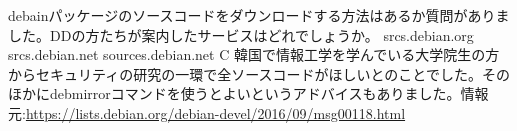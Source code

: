 %

\santaku
{debainパッケージのソースコードをダウンロードする方法はあるか質問がありました。DDの方たちが案内したサービスはどれでしょうか。}
{srcs.debian.org}
{srcs.debian.net}
{sources.debian.net}
{C}
{韓国で情報工学を学んでいる大学院生の方からセキュリティの研究の一環で全ソースコードがほしいとのことでした。そのほかにdebmirrorコマンドを使うとよいというアドバイスもありました。情報元:\url{https://lists.debian.org/debian-devel/2016/09/msg00118.html}}

